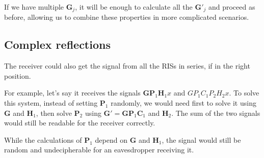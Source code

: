 If we have multiple $\bm{G}_j$, it will be enough to calculate all the $\bm{G}'_j$ and proceed as before, allowing us to combine these properties in more complicated scenarios.

\subsection{Complex reflections}

The receiver could also get the signal from all the RISs in series, if in the right position.

For example, let's say it receives the signals $\bm{GP}_1\bm{H}_1x$ and $GP_1C_1P_2H_2x$. To solve this system, instead of setting $\bm{P}_1$ randomly, we would need first to solve it using $\bm{G}$ and $\bm{H}_1$, then solve $\bm{P}_2$ using $\bm{G}'=\bm{GP}_1\bm{C}_1$ and $\bm{H}_2$. The sum of the two signals would still be readable for the receiver correctly.

While the calculations of $\bm{P}_1$ depend on $\bm{G}$ and $\bm{H}_1$, the signal would still be random and undecipherable for an eavesdropper receiving it.
